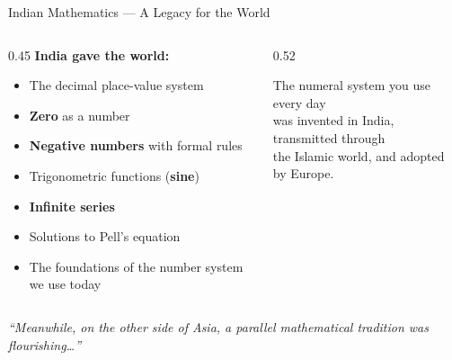 \begin{frame}{Indian Mathematics --- A Legacy for the World}

  \begin{columns}[T]
    \begin{column}{0.45\textwidth}
      \textbf{India gave the world:}
      \begin{itemize}
        \item The \alert{decimal place-value system}
        \item \textbf{Zero} as a number
        \item \textbf{Negative numbers} with formal rules
        \item Trigonometric functions (\textbf{sine})
        \item \textbf{Infinite series}
        \item Solutions to Pell's equation
        \item The foundations of the number system we use today
      \end{itemize}
    \end{column}

    \begin{column}{0.52\textwidth}

      \vspace{0.5em}
      {\small The numeral system you use every day\\
      was invented in India, transmitted through\\
      the Islamic world, and adopted by Europe.}
    \end{column}
  \end{columns}

  \vspace{0.3em}
  \begin{center}
    \textcolor{chineseRed}{\emph{``Meanwhile, on the other side of Asia, a parallel mathematical
    tradition was flourishing\ldots''}}
  \end{center}

\end{frame}
